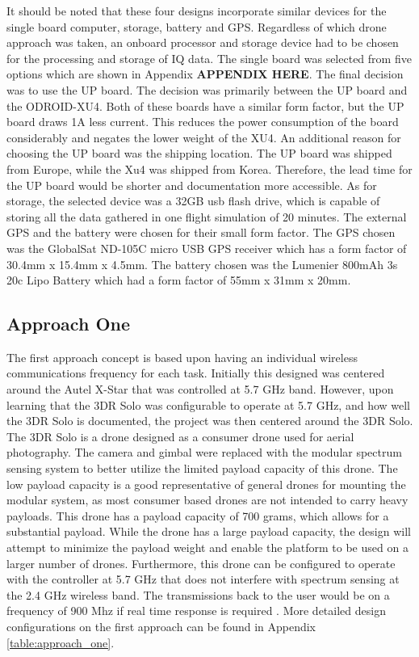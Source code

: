 It should be noted that these four designs incorporate similar devices for the single board computer, storage, battery and GPS. Regardless of which drone approach was taken, an onboard processor and storage device had to be chosen for the processing and storage of IQ data. The single board was selected from five options which are shown in Appendix \textbf{APPENDIX HERE}. The final decision was to use the UP board. The decision was primarily between the UP board and the ODROID-XU4. Both of these boards have a similar form factor, but the UP board draws 1A less current. This reduces the power consumption of the board considerably and negates the lower weight of the XU4. An additional reason for choosing the UP board was the shipping location. The UP board was shipped from Europe, while the Xu4 was shipped from Korea. Therefore, the lead time for the UP board would be shorter and documentation more accessible. As for storage, the selected device was a 32GB usb flash drive, which is capable of storing all the data gathered in one flight simulation of 20 minutes. %
The external GPS and the battery were chosen for their small form factor. The GPS chosen was the GlobalSat ND-105C micro USB GPS receiver which has a form factor of 30.4mm x 15.4mm x 4.5mm. The battery chosen was the Lumenier 800mAh 3s 20c Lipo Battery which had a form factor of 55mm x 31mm x 20mm.

\subsection{Approach One}
The first approach concept is based upon having an individual wireless communications frequency for each task. Initially this designed was centered around the Autel X-Star that was controlled at 5.7 GHz band. However, upon learning that the 3DR Solo was configurable to operate at 5.7 GHz, and how well the 3DR Solo is documented, the project was then centered around the 3DR Solo. The 3DR Solo is a drone designed as a consumer drone used for aerial photography. The camera and gimbal were replaced with the modular spectrum sensing system to better utilize the limited payload capacity of this drone. The low payload capacity is a good representative of general drones for mounting the modular system, as most consumer based drones are not intended to carry heavy payloads. This drone has a payload capacity of 700 grams, which allows for a substantial payload. While the drone has a large payload capacity, the design will attempt to minimize the payload weight and enable the platform to be used on a larger number of drones. Furthermore, this drone can be configured to operate with the controller at 5.7 GHz that does not interfere with spectrum sensing at the 2.4 GHz wireless band. The transmissions back to the user would be on a frequency of 900 Mhz if real time response is required \cite{3dr_Website}. More detailed design configurations on the first approach can be found in Appendix \ref{table:approach_one}.

